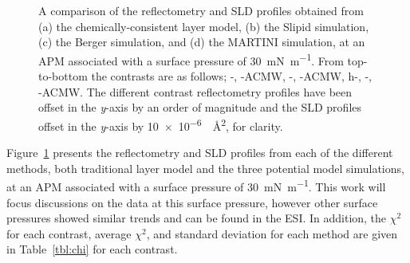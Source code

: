 \documentclass[amsmath,amssymb,twocolumn,superscriptaddress]{revtex4-1}
\begin{document}
\begin{figure}
 \caption{A comparison of the reflectometry and SLD profiles obtained from
 (a) the chemically-consistent layer model, (b) the Slipid simulation, (c) the Berger
 simulation, and (d) the MARTINI simulation, at an APM associated with a surface pressure of \SI{30}{\milli\newton\per\meter}. From top-to-bottom the contrasts are as
 follows; -, -ACMW, -,
 -ACMW, h-, -, -ACMW.
 The different contrast reflectometry profiles have been offset in the
 \emph{y}-axis by an order of magnitude and the SLD profiles offset in
 the \emph{y}-axis by \SI{10e-6}{\per\square\angstrom}, for clarity.}
 \label{fig:ref}
\end{figure}
%
Figure~\ref{fig:ref} presents the reflectometry and SLD profiles from each of the different methods, both traditional layer model and the three potential model simulations, at an APM associated with a surface pressure of \SI{30}{\milli\newton\per\meter}.
This work will focus discussions on the data at this surface pressure, however other surface pressures showed similar trends and can be found in the ESI.
In addition, the $\chi^2$ for each contrast, average $\chi^2$, and standard deviation for each method are given in Table~\ref{tbl:chi} for each contrast.
%
\end{document}
